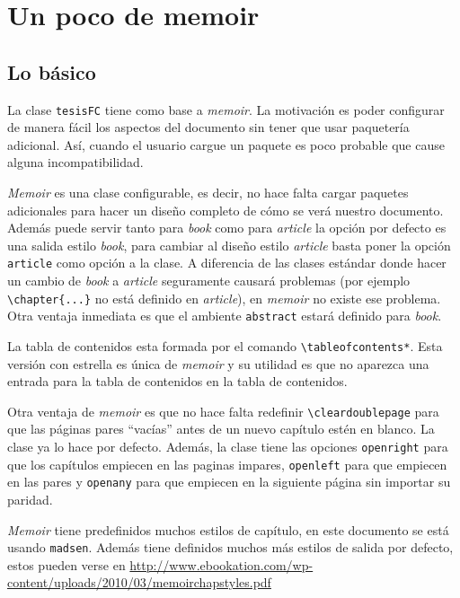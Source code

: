 
\chapter{Un poco de memoir}


\section{Lo básico}
La clase \texttt{tesisFC} tiene como base a \textit{memoir}. La motivación es poder configurar de manera fácil los aspectos del documento sin tener que usar paquetería adicional. Así, cuando el usuario cargue un paquete es poco probable que cause alguna incompatibilidad.

\textit{Memoir} es una clase configurable, es decir, no hace falta cargar paquetes adicionales para hacer un diseño completo de cómo se verá nuestro
documento. Además puede servir tanto para \textit{book} como para \textit{article} la opción por defecto es una salida estilo \textit{book}, para cambiar al diseño estilo \textit{article} basta poner la opción \texttt{article} como opción a la clase. A diferencia de las clases
estándar donde hacer un cambio de \textit{book} a \textit{article} seguramente causará problemas (por ejemplo \verb|\chapter{...}| no está
definido en \textit{article}), en \textit{memoir} no existe ese problema. Otra ventaja inmediata es que el ambiente \texttt{abstract} estará definido para \textit{book}.

La tabla de contenidos esta formada por el comando
\verb|\tableofcontents*|. Esta versión con estrella es única de \textit{memoir} y su utilidad es que no aparezca una entrada para la tabla de contenidos en la tabla de contenidos.

Otra ventaja de \textit{memoir} es que no hace falta redefinir
\verb|\cleardoublepage| para que las páginas pares \enquote{vacías} antes de un
nuevo capítulo estén en blanco. La clase ya lo hace por defecto. Además, la
clase tiene las opciones \texttt{openright} para que los capítulos empiecen
en las paginas impares, \texttt{openleft} para que empiecen en las pares y
\texttt{openany} para que empiecen en la siguiente página sin importar su
paridad.

\textit{Memoir} tiene predefinidos muchos estilos de capítulo, en este documento se está usando \texttt{madsen}. Además tiene
definidos muchos más estilos de salida por defecto, estos pueden verse en
\url{http://www.ebookation.com/wp-content/uploads/2010/03/memoirchapstyles.pdf}

